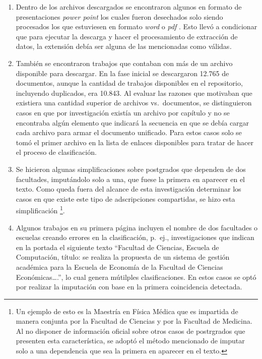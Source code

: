 \documentclass[
  12pt,
  openany]{book}
\begin{document}
\begin{enumerate}
  Con este último método se pudieron clasificar 1.658 trabajos, que equivalen a un 16,6\% del total. Es importante señalar que al aplicar este recurso se pueden generar ``falsos positivos'' y por esto en la sección \ref{pruebas}, ``Pruebas de Aceptación'', se hace una estimación estadística del error que puede representar acudir a este método.
\item
  Dentro de los archivos descargados se encontraron algunos en formato de presentaciones \emph{power point} los cuales fueron desechados solo siendo procesados los que estuviesen en formato \emph{word} o \emph{pdf} . Esto llevó a condicionar que para ejecutar la descarga y hacer el procesamiento de extracción de datos, la extensión debía ser alguna de las mencionadas como válidas\emph{.}
\item
  También se encontraron trabajos que contaban con más de un archivo disponible para descargar. En la fase inicial se descargaron 12.765 de documentos, aunque la cantidad de trabajos disponibles en el repositorio, incluyendo duplicados, era 10.843. Al evaluar las razones que motivaban que existiera una cantidad superior de archivos vs.~documentos, se distinguieron casos en que por investigación existía un archivo por capítulo y no se encontraba algún elemento que indicará la secuencia en que se debía cargar cada archivo para armar el documento unificado. Para estos casos solo se tomó el primer archivo en la lista de enlaces disponibles para tratar de hacer el proceso de clasificación.
\item
  Se hicieron algunas simplificaciones sobre postgrados que dependen de dos facultades, imputándolo solo a una, que fuese la primera en aparecer en el texto. Como queda fuera del alcance de esta investigación determinar los casos en que existe este tipo de adscripciones compartidas, se hizo esta simplificación \footnote{Un ejemplo de esto es la Maestría en Física Médica que es impartida de manera conjunta por la Facultad de Ciencias y por la Facultad de Medicina. Al no disponer de información oficial sobre otros casos de postrgrados que presenten esta característica, se adoptó el método mencionado de imputar solo a una dependencia que sea la primera en aparecer en el texto.}.
\item
  Algunos trabajos en su primera página incluyen el nombre de dos facultades o escuelas creando errores en la clasificación, p.~ej., investigaciones que indican en la portada el siguiente texto ``Facultad de Ciencias, Escuela de Computación, título: se realiza la propuesta de un sistema de gestión académica para la Escuela de Economía de la Facultad de Ciencias Económicas\ldots.'', lo cual genera mútilples clasificaciones. En estos casos se optó por realizar la imputación con base en la primera coincidencia detectada.

\end{enumerate}
\end{document}
